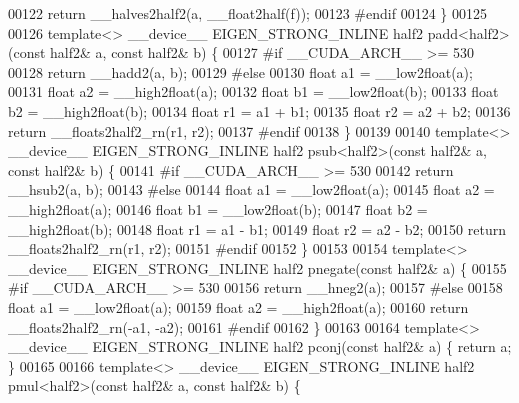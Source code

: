 \begin{DoxyCode}
00122   \textcolor{keywordflow}{return} \_\_halves2half2(a, \_\_float2half(f));
00123 \textcolor{preprocessor}{#endif}
00124 \}
00125 
00126 \textcolor{keyword}{template}<> \_\_device\_\_ EIGEN\_STRONG\_INLINE half2 padd<half2>(\textcolor{keyword}{const} half2& a, \textcolor{keyword}{const} half2& b) \{
00127 \textcolor{preprocessor}{#if \_\_CUDA\_ARCH\_\_ >= 530}
00128   \textcolor{keywordflow}{return} \_\_hadd2(a, b);
00129 \textcolor{preprocessor}{#else}
00130   \textcolor{keywordtype}{float} a1 = \_\_low2float(a);
00131   \textcolor{keywordtype}{float} a2 = \_\_high2float(a);
00132   \textcolor{keywordtype}{float} b1 = \_\_low2float(b);
00133   \textcolor{keywordtype}{float} b2 = \_\_high2float(b);
00134   \textcolor{keywordtype}{float} r1 = a1 + b1;
00135   \textcolor{keywordtype}{float} r2 = a2 + b2;
00136   \textcolor{keywordflow}{return} \_\_floats2half2\_rn(r1, r2);
00137 \textcolor{preprocessor}{#endif}
00138 \}
00139 
00140 \textcolor{keyword}{template}<> \_\_device\_\_ EIGEN\_STRONG\_INLINE half2 psub<half2>(\textcolor{keyword}{const} half2& a, \textcolor{keyword}{const} half2& b) \{
00141 \textcolor{preprocessor}{#if \_\_CUDA\_ARCH\_\_ >= 530}
00142   \textcolor{keywordflow}{return} \_\_hsub2(a, b);
00143 \textcolor{preprocessor}{#else}
00144   \textcolor{keywordtype}{float} a1 = \_\_low2float(a);
00145   \textcolor{keywordtype}{float} a2 = \_\_high2float(a);
00146   \textcolor{keywordtype}{float} b1 = \_\_low2float(b);
00147   \textcolor{keywordtype}{float} b2 = \_\_high2float(b);
00148   \textcolor{keywordtype}{float} r1 = a1 - b1;
00149   \textcolor{keywordtype}{float} r2 = a2 - b2;
00150   \textcolor{keywordflow}{return} \_\_floats2half2\_rn(r1, r2);
00151 \textcolor{preprocessor}{#endif}
00152 \}
00153 
00154 \textcolor{keyword}{template}<> \_\_device\_\_ EIGEN\_STRONG\_INLINE half2 pnegate(\textcolor{keyword}{const} half2& a) \{
00155 \textcolor{preprocessor}{#if \_\_CUDA\_ARCH\_\_ >= 530}
00156   \textcolor{keywordflow}{return} \_\_hneg2(a);
00157 \textcolor{preprocessor}{#else}
00158   \textcolor{keywordtype}{float} a1 = \_\_low2float(a);
00159   \textcolor{keywordtype}{float} a2 = \_\_high2float(a);
00160   \textcolor{keywordflow}{return} \_\_floats2half2\_rn(-a1, -a2);
00161 \textcolor{preprocessor}{#endif}
00162 \}
00163 
00164 \textcolor{keyword}{template}<> \_\_device\_\_ EIGEN\_STRONG\_INLINE half2 pconj(\textcolor{keyword}{const} half2& a) \{ \textcolor{keywordflow}{return} a; \}
00165 
00166 \textcolor{keyword}{template}<> \_\_device\_\_ EIGEN\_STRONG\_INLINE half2 pmul<half2>(\textcolor{keyword}{const} half2& a, \textcolor{keyword}{const} half2& b) \{

\end{DoxyCode}
